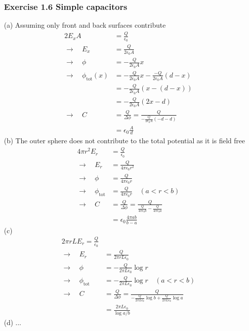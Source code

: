 \documentclass[10pt,a4paper]{article}
\theoremstyle{definition}
\begin{document}
\subsubsection{Exercise 1.6 Simple capacitors}
(a) Assuming only front and back surfaces contribute
\begin{align}
2E_xA&=\frac{Q}{\epsilon_0}\\
\rightarrow\quad E_x&=\frac{Q}{2\epsilon_0A}\\
\rightarrow\quad \phi&=-\frac{Q}{2\epsilon_0A}x\\
\rightarrow\quad \phi_\text{tot}(x)&=-\frac{Q}{2\epsilon_0A}x-\frac{-Q}{2\epsilon_0A}(d-x)\\
&=-\frac{Q}{2\epsilon_0A}(x-(d-x))\\
&=-\frac{Q}{2\epsilon_0A}(2x-d)\\
\rightarrow\quad C&=\frac{Q}{\Delta\phi}=\frac{Q}{-\frac{Q}{2\epsilon_0A}(-d-d)}\\
&=\epsilon_0\frac{A}{d}
\end{align}
(b) The outer sphere does not contribute to the total potential as it is field free
\begin{align}
4\pi r^2 E_r&=\frac{Q}{\epsilon_0}\\
\rightarrow\quad E_r&=\frac{Q}{4\pi\epsilon_0 r^2}\\
\rightarrow\quad \phi&=\frac{Q}{4\pi\epsilon_0 r}\\
\rightarrow\quad \phi_\text{tot}&=\frac{Q}{4\pi\epsilon_0 r}\quad(a<r<b)\\
\rightarrow\quad C&=\frac{Q}{\Delta\phi}=\frac{Q}{\frac{Q}{4\pi\epsilon_0 b}-\frac{Q}{4\pi\epsilon_0 a}}\\
&=\epsilon_0\frac{4\pi ab}{b-a}
\end{align}
(c) 
\begin{align}
2\pi r L E_r=\frac{Q}{\epsilon_0}\\
\rightarrow\quad E_r&=\frac{Q}{2\pi r L\epsilon_0}\\
\rightarrow\quad \phi&=-\frac{Q}{2\pi L\epsilon_0}\log r\\
\rightarrow\quad \phi_\text{tot}&=-\frac{Q}{2\pi L\epsilon_0}\log r\quad(a<r<b)\\
\rightarrow\quad C&=\frac{Q}{\Delta\phi}=\frac{Q}{-\frac{Q}{2\pi L\epsilon_0}\log b+\frac{Q}{2\pi L\epsilon_0}\log a}\\
&=\frac{2\pi L\epsilon_0}{\log a/b}
\end{align}
(d) ...
\end{document}
